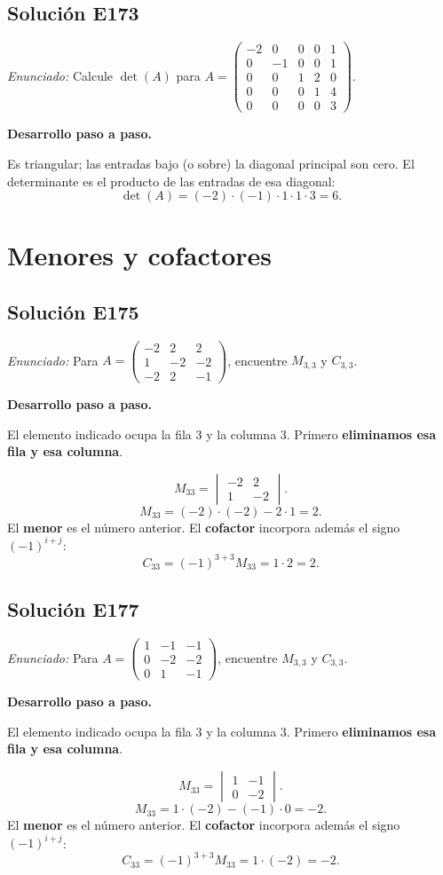 \documentclass[12pt]{article}
\theoremstyle{remark}
\newcommand{\solucion}[2]{\Needspace{11\baselineskip}\subsection*{Solución E#1}\noindent\textit{Enunciado:} #2\par\medskip\noindent\textbf{Desarrollo paso a paso.}\par\medskip}
\begin{document}
\medskip

\solucion{173}{Calcule $\det(A)$ para $A=\begin{pmatrix}-2&0&0&0&1\\0&-1&0&0&1\\0&0&1&2&0\\0&0&0&1&4\\0&0&0&0&3\end{pmatrix}$.}
Es triangular; las entradas bajo (o sobre) la diagonal principal son cero. El determinante es el producto de las entradas de esa diagonal:
\[
\det(A)=(-2)\cdot (-1)\cdot 1\cdot 1\cdot 3=6.
\]

\medskip

\section{Menores y cofactores}

\solucion{175}{Para $A=\begin{pmatrix}-2&2&2\\1&-2&-2\\-2&2&-1\end{pmatrix}$, encuentre $M_{3,3}$ y $C_{3,3}$.}
El elemento indicado ocupa la fila 3 y la columna 3. Primero \textbf{eliminamos esa fila y esa columna}.

\[
M_{33}=\begin{vmatrix}-2&2\\1&-2\end{vmatrix}.
\]
\[
M_{33}=(-2)\cdot (-2)-2\cdot 1=2.
\]
El \textbf{menor} es el número anterior. El \textbf{cofactor} incorpora además el signo $(-1)^{i+j}$:
\[
\boxed{C_{33}=(-1)^{3+3}M_{33}=1\cdot 2=2}.
\]

\medskip

\solucion{177}{Para $A=\begin{pmatrix}1&-1&-1\\0&-2&-2\\0&1&-1\end{pmatrix}$, encuentre $M_{3,3}$ y $C_{3,3}$.}
El elemento indicado ocupa la fila 3 y la columna 3. Primero \textbf{eliminamos esa fila y esa columna}.

\[
M_{33}=\begin{vmatrix}1&-1\\0&-2\end{vmatrix}.
\]
\[
M_{33}=1\cdot (-2)-(-1)\cdot 0=-2.
\]
El \textbf{menor} es el número anterior. El \textbf{cofactor} incorpora además el signo $(-1)^{i+j}$:
\[
\boxed{C_{33}=(-1)^{3+3}M_{33}=1\cdot (-2)=-2}.
\]
\end{document}
